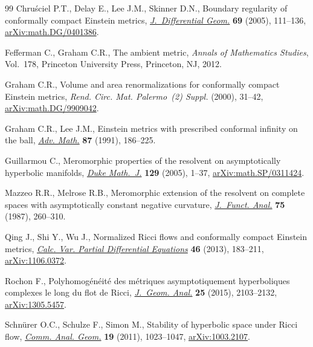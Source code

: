 \documentclass[11pt]{article}
\numberwithin{equation}{section}
\begin{document}
\begin{thebibliography}{99}
Chru\'{s}ciel P.T., Delay E., Lee J.M., Skinner D.N., Boundary regularity of
 conformally compact {E}instein metrics, \href{https://doi.org/10.4310/jdg/1121540341}{\textit{J.~Differential Geom.}}
 \textbf{69} (2005), 111--136, \href{https://arxiv.org/abs/math.DG/0401386}{arXiv:math.DG/0401386}.

Fefferman C., Graham C.R., The ambient metric, \textit{Annals of Mathematics
 Studies}, Vol.~178, Princeton University Press, Princeton, NJ, 2012.

Graham C.R., Volume and area renormalizations for conformally compact
 {E}instein metrics, \textit{Rend. Circ. Mat. Palermo~(2) Suppl.} (2000),
 31--42, \href{https://arxiv.org/abs/math.DG/9909042}{arXiv:math.DG/9909042}.

Graham C.R., Lee J.M., Einstein metrics with prescribed conformal infinity on
 the ball, \href{https://doi.org/10.1016/0001-8708(91)90071-E}{\textit{Adv. Math.}} \textbf{87} (1991), 186--225.

Guillarmou C., Meromorphic properties of the resolvent on asymptotically
 hyperbolic manifolds, \href{https://doi.org/10.1215/S0012-7094-04-12911-2}{\textit{Duke Math.~J.}} \textbf{129} (2005), 1--37,
 \href{https://arxiv.org/abs/math.SP/0311424}{arXiv:math.SP/0311424}.

Mazzeo R.R., Melrose R.B., Meromorphic extension of the resolvent on complete
 spaces with asymptotically constant negative curvature, \href{https://doi.org/10.1016/0022-1236(87)90097-8}{\textit{J.~Funct.
 Anal.}} \textbf{75} (1987), 260--310.

Qing J., Shi Y., Wu J., Normalized {R}icci flows and conformally compact
 {E}instein metrics, \href{https://doi.org/10.1007/s00526-011-0479-7}{\textit{Calc. Var. Partial Differential Equations}}
 \textbf{46} (2013), 183--211, \href{https://arxiv.org/abs/1106.0372}{arXiv:1106.0372}.

Rochon F., Polyhomog\'{e}n\'{e}it\'{e} des m\'{e}triques asymptotiquement
 hyperboliques complexes le long du flot de {R}icci, \href{https://doi.org/10.1007/s12220-014-9505-2}{\textit{J.~Geom. Anal.}}
 \textbf{25} (2015), 2103--2132, \href{https://arxiv.org/abs/1305.5457}{arXiv:1305.5457}.

Schn\"{u}rer O.C., Schulze F., Simon M., Stability of hyperbolic space under
 {R}icci flow, \href{https://doi.org/10.4310/CAG.2011.v19.n5.a8}{\textit{Comm. Anal. Geom.}} \textbf{19} (2011), 1023--1047,
 \href{https://arxiv.org/abs/1003.2107}{arXiv:1003.2107}.


\end{thebibliography}
\end{document}
